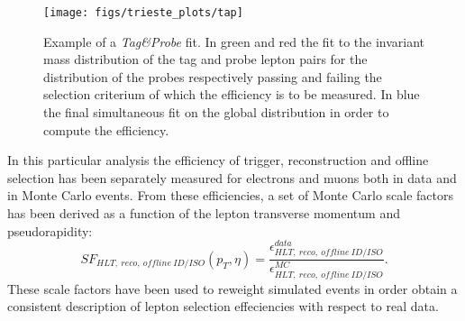 \begin{figure}[htb]
        \begin{center}
                \leavevmode
                \texttt{[image: figs/trieste\_plots/tap]}
        \end{center}
        \caption{Example of a \textit{Tag\&Probe} fit. In green and red
          the fit to the invariant mass distribution of the
          tag and probe lepton pairs for the distribution of the probes
          respectively passing and failing the selection criterium of
          which the efficiency is to be measured.
          In blue the final simultaneous fit on the global distribution
          in order to compute the efficiency.}
        \label{fig:tagandprobefit}
\end{figure}

In this particular analysis the efficiency of trigger, reconstruction and
offline selection has been separately measured for electrons and muons both
in data and in Monte Carlo events. From these efficiencies,
a set of Monte Carlo scale factors has been derived as a function of the
lepton transverse momentum and pseudorapidity:
$$SF_{HLT,~reco,~offline~ID/ISO} (p_{T},\eta) = \frac{\epsilon_{HLT,~reco,~offline~ID/ISO}^{data}}{\epsilon_{HLT,~reco,~offline~ID/ISO}^{MC}} \mathrm{.}$$
These scale factors have been used to reweight simulated events in order obtain
a consistent description of lepton selection effeciencies with respect to real data.
